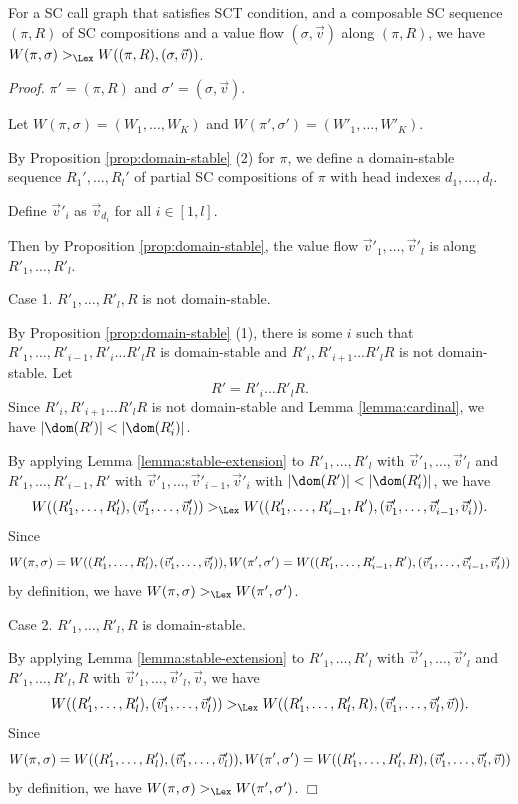 \begin{Prop}\label{prop:decrease-pi}
For a SC call graph that satisfies SCT condition, and
a composable SC sequence $(\pi,R)$ of SC compositions and 
a value flow $(\sigma,\Vec v)$ along $(\pi,R)$,
we have $W(\pi,\sigma) >_\Lex W((\pi,R),(\sigma,\Vec v))$.
\end{Prop}

{\em Proof.}
$\pi' = (\pi,R)$ and
$\sigma' = (\sigma,\Vec v)$.

Let $W(\pi,\sigma) = (W_1,\ldots,W_K)$ and
$W(\pi',\sigma') = (W'_1,\ldots,W'_K)$.

By Proposition \ref{prop:domain-stable} (2) for $\pi$, we define
a domain-stable sequence $R_1',\ldots,R_l'$ 
of partial SC compositions of $\pi$ with 
head indexes $d_1,\ldots,d_l$.

Define $\Vec v'_i$ as $\Vec v_{d_i}$ for all $i \in [1,l]$.

Then by Proposition \ref{prop:domain-stable}, 
the value flow $\Vec v'_1,\ldots,\Vec v'_l$ is
along $R'_1,\ldots,R'_l$.

Case 1. $R'_1,\ldots,R'_l,R$ is not domain-stable.

By Proposition \ref{prop:domain-stable} (1),
there is some $i$ such that $R'_1,\ldots,R'_{i-1},R'_i\ldots R'_lR$
is domain-stable and $R'_i,R'_{i+1}\ldots R'_lR$ is not domain-stable.
Let
\[
R' = R'_i\ldots R'_lR.
\]
Since $R'_i,R'_{i+1}\ldots R'_lR$ is not domain-stable and Lemma \ref{lemma:cardinal},
we have $|\dom(R')|<|\dom(R'_i)|$.

By applying Lemma \ref{lemma:stable-extension}
to $R'_1,\ldots,R'_l$ with $\Vec v'_1,\ldots,\Vec v'_l$ and
$R'_1,\ldots,R'_{i-1},R'$ with 
$\Vec v'_1,\ldots,\Vec v'_{i-1},\Vec v'_i$ with
$|\dom(R')|<|\dom(R'_i)|$,
we have
\[
W((R'_1,\ldots,R'_l),(\Vec v'_1,\ldots,\Vec v'_l)) >_\Lex
W((R'_1,\ldots,R'_{i-1},R'),
(\Vec v'_1,\ldots,\Vec v'_{i-1},\Vec v'_i)).
\]
Since
\[
W(\pi,\sigma) = W((R'_1,\ldots,R'_l),(\Vec v'_1,\ldots,\Vec v'_l)), \\
W(\pi',\sigma') = W((R'_1,\ldots,R'_{i-1},R'),
(\Vec v'_1,\ldots,\Vec v'_{i-1},\Vec v'_i))
\]
by definition, we have 
$W(\pi,\sigma) >_\Lex W(\pi',\sigma')$.

Case 2. $R'_1,\ldots,R'_l,R$ is domain-stable.

By applying Lemma \ref{lemma:stable-extension}
to $R'_1,\ldots,R'_{l}$ with $\Vec v'_1,\ldots,\Vec v'_l$ and
$R'_1,\ldots,R'_{l},R$ with $\Vec v'_1,\ldots,\Vec v'_l,\Vec v$,
we have
\[
W((R'_1,\ldots,R'_{l}), (\Vec v'_1,\ldots,\Vec v'_l)) >_\Lex
W((R'_1,\ldots,R'_{l},R), (\Vec v'_1,\ldots,\Vec v'_l,\Vec v)).
\]
Since
\[
W(\pi,\sigma) = W((R'_1,\ldots,R'_{l}), (\Vec v'_1,\ldots,\Vec v'_l)), \\
W(\pi',\sigma') = 
W((R'_1,\ldots,R'_{l},R), (\Vec v'_1,\ldots,\Vec v'_l,\Vec v))
\]
by definition, we have 
$W(\pi,\sigma) >_\Lex W(\pi',\sigma')$.
$\Box$

